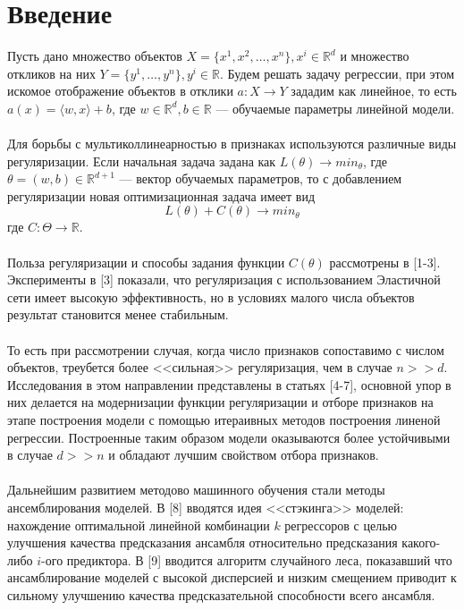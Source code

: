 \documentclass{article}
\begin{document}
\section{Введение}
Пусть дано множество объектов $X = \{x^1, x^2, \dots , x^n\}, x^i \in \mathbb{R}^d$ и множество откликов на них $Y = \{y^1, \dots, y^n\}, y^i \in \mathbb{R}$. Будем решать задачу регрессии, при этом искомое отображение объектов в отклики $a: X \rightarrow Y$ зададим как линейное, то есть  $a(x) = \langle w, x \rangle + b$, где $w \in \mathbb{R}^d, b \in \mathbb{R}$ — обучаемые параметры линейной модели.\\ \\
Для борьбы с мультиколлинеарностью в признаках используются различные виды регуляризации. Если начальная задача задана как $L(\theta) \rightarrow min_{\theta}$, где $\theta = (w, b) \in \mathbb{R}^{d+1}$ — вектор обучаемых параметров, то с добавлением регуляризации новая оптимизационная задача имеет вид \begin{equation}L(\theta) + C(\theta) \rightarrow min_{\theta} \end{equation} где $C: \Theta \rightarrow \mathbb{R}$. \\ \\
Польза регуляризации и способы задания функции $C(\theta)$ рассмотрены в [1-3]. Эксперименты в [3] показали, что регуляризация с использованием Эластичной сети имеет высокую эффективность, но в условиях малого числа объектов результат становится менее стабильным. 
\\ \\
То есть при рассмотрении случая, когда число признаков сопоставимо с числом объектов, треубется более <<сильная>> регуляризация, чем в случае $n>>d$. Исследования в этом направлении представлены в статьях [4-7], основной упор в них делается на модернизации функции регуляризации и отборе признаков на этапе построения модели с помощью итераивных методов построения линеной регрессии. Построенные таким образом модели оказываются более устойчивыми в случае $d >> n$ и обладают лучшим свойством отбора признаков. 
\\ \\
Дальнейшим развитием методово машинного обучения стали методы ансемблирования моделей. В [8] вводятся идея <<стэкинга>> моделей: нахождение оптимальной линейной комбинации $k$ регрессоров с целью улучшения качества предсказания ансамбля относительно предсказания какого-либо $i$-ого предиктора. В [9] вводится алгоритм случайного леса, показавший что ансамблирование моделей с высокой дисперсией и низким смещением приводит к сильному улучшению качества предсказательной способности всего ансамбля.
\end{document}

